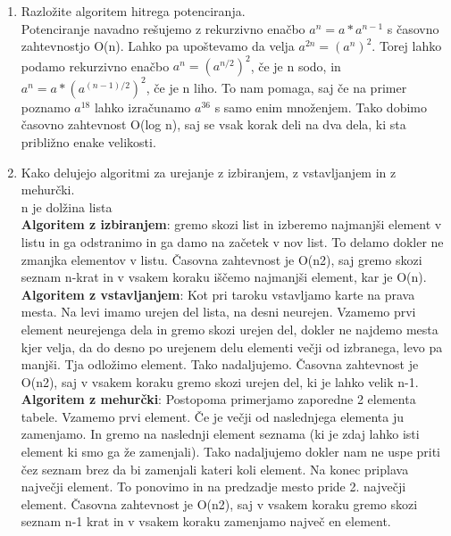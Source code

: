 \documentclass[a4paper]{article}
\begin{document}
\begin{enumerate}
        \item Razložite algoritem hitrega potenciranja.\\
        Potenciranje navadno rešujemo z rekurzivno enačbo $a^n = a * a^{n-1}$ s časovno zahtevnostjo O(n). Lahko pa upoštevamo da velja $a^{2n} = (a^n)^2$. Torej lahko podamo rekurzivno enačbo $a^n = (a^{n/2})^2$, če je n sodo, in $a^n = a * (a^{(n-1)/2})^2$, če je n liho. To nam pomaga, saj če na primer poznamo $a^18$ lahko izračunamo $a^36$ s samo enim množenjem. Tako dobimo časovno zahtevnost O(log n), saj se vsak korak deli na dva dela, ki sta približno enake velikosti.

        \item Kako delujejo algoritmi za urejanje z izbiranjem, z vstavljanjem in z mehurčki.\\
        n je dolžina lista\\
        \textbf{Algoritem z izbiranjem}: gremo skozi list in izberemo najmanjši element v listu in ga odstranimo in ga damo na začetek v nov list. To delamo dokler ne zmanjka elementov v listu. Časovna zahtevnost je O(n2), saj gremo skozi seznam n-krat in v vsakem koraku iščemo najmanjši element, kar je O(n).\\
        \textbf{Algoritem z vstavljanjem}: Kot pri taroku vstavljamo karte na prava mesta. Na levi imamo urejen del lista, na desni neurejen. Vzamemo prvi element neurejenga dela in gremo skozi urejen del, dokler ne najdemo mesta kjer velja, da do desno po urejenem delu elementi večji od izbranega, levo pa manjši. Tja odložimo element. Tako nadaljujemo. Časovna zahtevnost je O(n2), saj v vsakem koraku gremo skozi urejen del, ki je lahko velik n-1.\\
        \textbf{Algoritem z mehurčki}: Postopoma primerjamo zaporedne 2 elementa tabele. Vzamemo prvi element. Če je večji od naslednjega elementa ju zamenjamo. In gremo na naslednji element seznama (ki je zdaj lahko isti element ki smo ga že zamenjali). Tako nadaljujemo dokler nam ne uspe priti čez seznam brez da bi zamenjali kateri koli element. Na konec priplava največji element. To ponovimo in na predzadje mesto pride 2. največji element. Časovna zahtevnost je O(n2), saj v vsakem koraku gremo skozi seznam n-1 krat in v vsakem koraku zamenjamo največ en element.


\end{enumerate}
\end{document}
